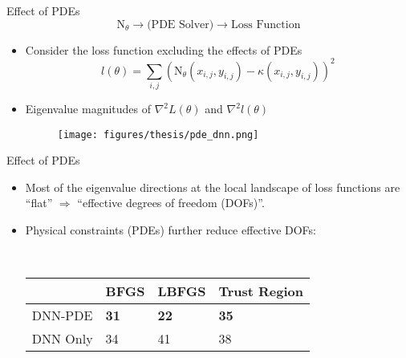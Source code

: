 \documentclass[usenames,dvipsnames]{beamer}
\begin{document}
\begin{frame}{Effect of PDEs}
	$$\text{N}_\theta \rightarrow \text{(PDE Solver)}  \rightarrow \text{Loss Function}$$
	\vspace{-0.5cm}
	\begin{itemize}
\item Consider the loss function excluding the effects of PDEs 
$$    l(\theta) = \sum_{i,j} (\text{N}_\theta(x_{i,j}, y_{i,j}) - \kappa(x_{i,j}, y_{i,j}))^2 $$

\item Eigenvalue magnitudes of $\nabla^2 L(\theta)$ and $\nabla^2 l(\theta)$
	\begin{figure}[htbp]
	\centering
	\texttt{[image: figures/thesis/pde\_dnn.png]}
\end{figure}
	\end{itemize}
\end{frame}

\begin{frame}{Effect of PDEs}
\begin{itemize}
\item Most of the eigenvalue directions at the local landscape of loss functions are ``flat'' $\Rightarrow$ ``effective degrees of freedom (DOFs)''. 

\item Physical constraints (PDEs) further reduce effective DOFs:

\

\begin{center}
		\begin{tabular}{@{}llll@{}}
		\toprule
		& BFGS & LBFGS & Trust Region \\ \midrule
		DNN-PDE     & \textbf{31}   & \textbf{22}    & \textbf{35}           \\
		DNN Only &  34   & 41    & 38           \\ \bottomrule
	\end{tabular}
\end{center}


\end{itemize}
\end{frame}
\end{document}
